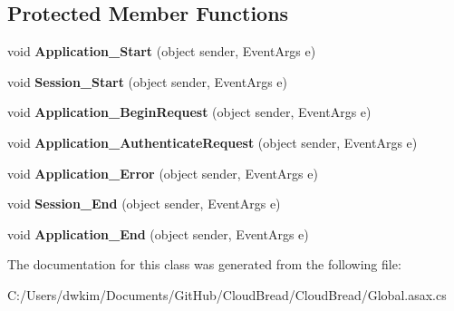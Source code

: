 \subsection*{Protected Member Functions}
\begin{DoxyCompactItemize}
\item 
void {\bfseries Application\+\_\+\+Start} (object sender, Event\+Args e)\hypertarget{class_cloud_bread_1_1_global_a396d25a39052b762fa2213e392ddc797}{}\label{class_cloud_bread_1_1_global_a396d25a39052b762fa2213e392ddc797}

\item 
void {\bfseries Session\+\_\+\+Start} (object sender, Event\+Args e)\hypertarget{class_cloud_bread_1_1_global_a8708272a1a0e193b8d608c204b915e40}{}\label{class_cloud_bread_1_1_global_a8708272a1a0e193b8d608c204b915e40}

\item 
void {\bfseries Application\+\_\+\+Begin\+Request} (object sender, Event\+Args e)\hypertarget{class_cloud_bread_1_1_global_a1876449576a2bb502623da2c132321d8}{}\label{class_cloud_bread_1_1_global_a1876449576a2bb502623da2c132321d8}

\item 
void {\bfseries Application\+\_\+\+Authenticate\+Request} (object sender, Event\+Args e)\hypertarget{class_cloud_bread_1_1_global_a4e8a04fe20ec51fa332bc9de44c169b6}{}\label{class_cloud_bread_1_1_global_a4e8a04fe20ec51fa332bc9de44c169b6}

\item 
void {\bfseries Application\+\_\+\+Error} (object sender, Event\+Args e)\hypertarget{class_cloud_bread_1_1_global_a28279fb2abc32e11a0bb8426883c218f}{}\label{class_cloud_bread_1_1_global_a28279fb2abc32e11a0bb8426883c218f}

\item 
void {\bfseries Session\+\_\+\+End} (object sender, Event\+Args e)\hypertarget{class_cloud_bread_1_1_global_a2837df16b0eae9e085156b8e064c4f14}{}\label{class_cloud_bread_1_1_global_a2837df16b0eae9e085156b8e064c4f14}

\item 
void {\bfseries Application\+\_\+\+End} (object sender, Event\+Args e)\hypertarget{class_cloud_bread_1_1_global_abbeb7280f6d00e11731d635e24aae8f3}{}\label{class_cloud_bread_1_1_global_abbeb7280f6d00e11731d635e24aae8f3}

\end{DoxyCompactItemize}


The documentation for this class was generated from the following file\+:\begin{DoxyCompactItemize}
\item 
C\+:/\+Users/dwkim/\+Documents/\+Git\+Hub/\+Cloud\+Bread/\+Cloud\+Bread/Global.\+asax.\+cs\end{DoxyCompactItemize}
